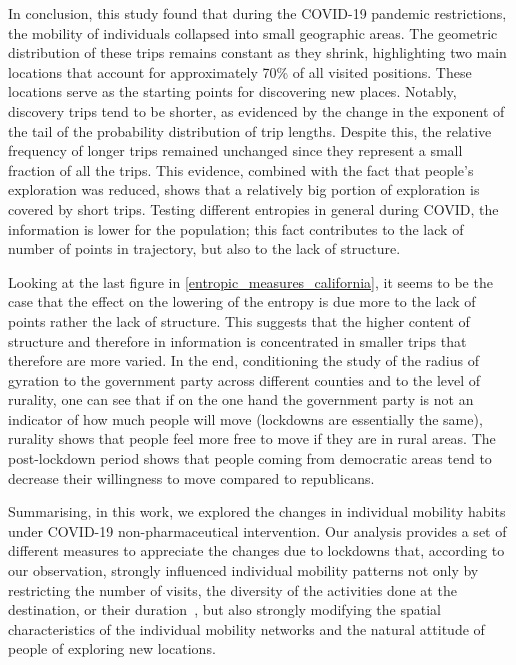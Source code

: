\documentclass[main.tex]{subfiles}
\begin{document}
\label{conclusion}

In conclusion, this study found that during the COVID-19 pandemic restrictions, the mobility of individuals collapsed into small geographic areas. The geometric distribution of these trips remains constant as they shrink, highlighting two main locations that account for approximately 70$\%$ of all visited positions. These locations serve as the starting points for discovering new places. Notably, discovery trips tend to be shorter, as evidenced by the change in the exponent of the tail of the probability distribution of trip lengths. Despite this, the relative frequency of longer trips remained unchanged since they represent a small fraction of all the trips. This evidence, combined with the fact that people's exploration was reduced, shows that a relatively big portion of exploration is covered by short trips. Testing different entropies in general during COVID, the information is lower for the population; this fact contributes to the lack of number of points in trajectory, but also to the lack of structure.

Looking at the last figure in \ref{entropic_measures_california}, it seems to be the case that the effect on the lowering of the entropy is due more to the lack of points rather the lack of structure. This suggests that the higher content of structure and therefore in information is concentrated in smaller trips that therefore are more varied. In the end, conditioning the study of the radius of gyration to the government party across different counties and to the level of rurality, one can see that if on the one hand the government party is not an indicator of how much people will move (lockdowns are essentially the same), rurality shows that people feel more free to move if they are in rural areas. The post-lockdown period shows that people coming from democratic areas tend to decrease their willingness to move compared to republicans.

Summarising, in this work, we explored the changes in individual mobility habits under COVID-19 non-pharmaceutical intervention. Our analysis provides a set of different measures to appreciate the changes due to lockdowns that, according to our observation, strongly influenced individual mobility patterns not only by restricting the number of visits, the diversity of the activities done at the destination, or their duration~\cite{lucchini}, but also strongly modifying the spatial characteristics of the individual mobility networks and the natural attitude of people of exploring new locations.
\end{document}
